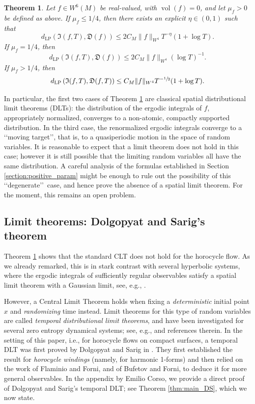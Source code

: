 \documentclass[11pt]{article}
\newcommand{\ie}{i.e.,\xspace}
\newcommand{\Levy}{d_{\levyy}}
\DeclareMathOperator{\vol}{vol}
\DeclareMathOperator{\levyy}{LP}
\newtheorem{theorem}{Theorem}
\theoremstyle{definition}
\begin{document}
\begin{theorem}\label{thm:main_BF1}
Let $f \in W^6(M)$ be real-valued, with $\vol(f)=0$, and let $\mu_f >0 $ be defined as above.
If $\mu_f \leq 1/4$, then there exists an explicit $\eta \in (0,1)$ such that
\[
\Levy \left(\mathfrak{I}(f,T), \mathfrak{D}(f) \right) \leq 2C_M \|f\|_{W^4} T^{-\eta}(1+\log T).
\]
If $\mu_f=1/4$, then
\[
\Levy \left(\mathfrak{I}(f,T), \mathfrak{D}(f) \right) \leq 2C_M \|f\|_{W^4}(\log T)^{-1}.
\]
If $\mu_f > 1/4$, then
\[
\Levy \left(\mathfrak{I}(f,T), \mathfrak{D}(f,T) \right) \leq C_M \|f\|_{W^4} T^{-\sfrac{1}{2}}(1+\log T).
\]
\end{theorem}

In particular, the first two cases of Theorem \ref{thm:main_BF1} are classical spatial distributional limit theorems (DLTs): the distribution of the ergodic integrals of $f$, appropriately normalized, converges to a non-atomic, compactly supported distribution.
In the third case, the renormalized ergodic integrals converge to a \lq\lq moving target\rq\rq, that is, to a quasiperiodic motion in the space of random variables.
It is reasonable to expect that a limit theorem does not hold in this case; however it is still possible that the limiting random variables all have the same distribution. A careful analysis of the formulas established in Section \ref{section:positive_param} might be enough to rule out the possibility of this \lq\lq degenerate\rq\rq\ case, and hence prove the absence of a spatial limit theorem. For the moment, this remains an open problem.

\subsection{Limit theorems: Dolgopyat and Sarig's theorem}

Theorem \ref{thm:main_BF1} shows that the standard CLT does not hold for the horocycle flow. As we already remarked, this is in stark contrast with several hyperbolic systems, where the ergodic integrals of sufficiently regular observables satisfy a spatial limit theorem with a Gaussian limit, see, e.g., \cite{Rat:CLT}.

However, a Central Limit Theorem holds when fixing a \emph{deterministic} initial point $x$ and \emph{randomizing} time instead.
Limit theorems for this type of random variables are called \emph{temporal distributional limit theorems}, and have been investigated for several zero entropy dynamical systems; see, e.g., \cite{Bec1, Bec2, ADDS, Dolgopyat-Sarig, PaSo, BrUl} and references therein.
In the setting of this paper, \ie for horocycle flows on compact surfaces, a temporal DLT was first proved by Dolgopyat and Sarig in \cite{Dolgopyat-Sarig}. They first established the result for \emph{horocycle windings} (namely, for harmonic 1-forms) and then relied on the work of Flaminio and Forni, and of Bufetov and Forni, to deduce it for more general observables. In the appendix by Emilio Corso, we provide a direct proof of Dolgopyat and Sarig's temporal DLT; see Theorem \ref{thm:main_DS}, which we now state.
\end{document}

